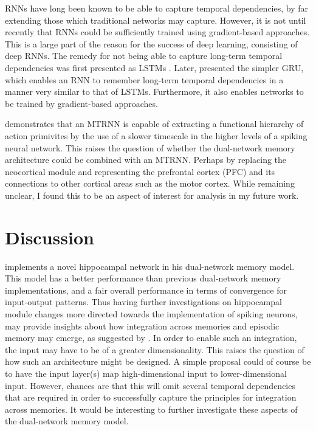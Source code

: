 
RNNs have long been known to be able to capture temporal dependencies, by far extending those which traditional networks may capture. However, it is not until recently that RNNs could be sufficiently trained using gradient-based approaches. This is a large part of the reason for the success of deep learning, consisting of deep RNNs. The remedy for not being able to capture long-term temporal dependencies was first presented as LSTMs \citep{Hochreiter1997}. Later, \cite{Cho2014} presented the simpler GRU, which enables an RNN to remember long-term temporal dependencies in a manner very similar to that of LSTMs. Furthermore, it also enables networks to be trained by gradient-based approaches.



\cite{Tani2014} demonstrates that an MTRNN is capable of extracting a functional hierarchy of action primivites by the use of a slower timescale in the higher levels of a spiking neural network. This raises the question of whether the dual-network memory architecture could be combined with an MTRNN. Perhaps by replacing the neocortical module and representing the prefrontal cortex (PFC) and its connections to other cortical areas such as the motor cortex. While remaining unclear, I found this to be an aspect of interest for analysis in my future work.


\section{Discussion}\label{discussion}

\cite{Hattori2014} implements a novel hippocampal network in his dual-network memory model. This model has a better performance than previous dual-network memory implementations, and a fair overall performance in terms of convergence for input-output patterns. Thus having further investigations on hippocampal module changes more directed towards the implementation of spiking neurons, may provide insights about how integration across memories and episodic memory may emerge, as suggested by \cite{Hattori2014}. In order to enable such an integration, the input may have to be of a greater dimensionality. This raises the question of how such an architecture might be designed. A simple proposal could of course be to have the input layer(s) map high-dimensional input to lower-dimensional input. However, chances are that this will omit several temporal dependencies that are required in order to successfully capture the principles for integration across memories. It would be interesting to further investigate these aspects of the dual-network memory model.

